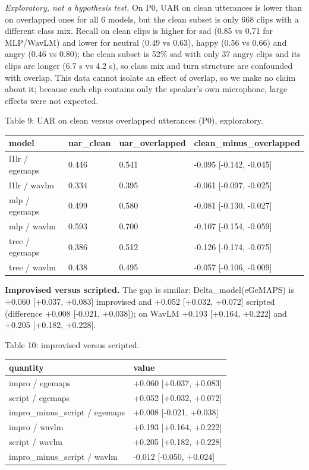 \documentclass[11pt]{article}
\begin{document}
\emph{Exploratory, not a hypothesis test.} On P0, UAR on clean utterances is lower than on overlapped ones for all 6 models, but the clean subset is only 668 clips with a different class mix. Recall on clean clips is higher for sad (0.85 vs 0.71 for MLP/WavLM) and lower for neutral (0.49 vs 0.63), happy (0.56 vs 0.66) and angry (0.46 vs 0.80); the clean subset is 52\% sad with only 37 angry clips and its clips are longer (6.7 s vs 4.2 s), so class mix and turn structure are confounded with overlap. This data cannot isolate an effect of overlap, so we make no claim about it; because each clip contains only the speaker's own microphone, large effects were not expected.

Table 9: UAR on clean versus overlapped utterances (P0), exploratory.

\begin{longtable}[]{@{}llll@{}}
\toprule\noalign{}
model & uar\_clean & uar\_overlapped & clean\_minus\_overlapped \\
\midrule\noalign{}
\endhead
\bottomrule\noalign{}
\endlastfoot
l1lr / egemaps & 0.446 & 0.541 & -0.095 {[}-0.142, -0.045{]} \\
l1lr / wavlm & 0.334 & 0.395 & -0.061 {[}-0.097, -0.025{]} \\
mlp / egemaps & 0.499 & 0.580 & -0.081 {[}-0.130, -0.027{]} \\
mlp / wavlm & 0.593 & 0.700 & -0.107 {[}-0.154, -0.059{]} \\
tree / egemaps & 0.386 & 0.512 & -0.126 {[}-0.174, -0.075{]} \\
tree / wavlm & 0.438 & 0.495 & -0.057 {[}-0.106, -0.009{]} \\
\end{longtable}

\textbf{Improvised versus scripted.} The gap is similar: Delta\_model(eGeMAPS) is +0.060 {[}+0.037, +0.083{]} improvised and +0.052 {[}+0.032, +0.072{]} scripted (difference +0.008 {[}-0.021, +0.038{]}); on WavLM +0.193 {[}+0.164, +0.222{]} and +0.205 {[}+0.182, +0.228{]}.

Table 10: improvised versus scripted.

\begin{longtable}[]{@{}ll@{}}
\toprule\noalign{}
quantity & value \\
\midrule\noalign{}
\endhead
\bottomrule\noalign{}
\endlastfoot
impro / egemaps & +0.060 {[}+0.037, +0.083{]} \\
script / egemaps & +0.052 {[}+0.032, +0.072{]} \\
impro\_minus\_script / egemaps & +0.008 {[}-0.021, +0.038{]} \\
impro / wavlm & +0.193 {[}+0.164, +0.222{]} \\
script / wavlm & +0.205 {[}+0.182, +0.228{]} \\
impro\_minus\_script / wavlm & -0.012 {[}-0.050, +0.024{]} \\
\end{longtable}
\end{document}
